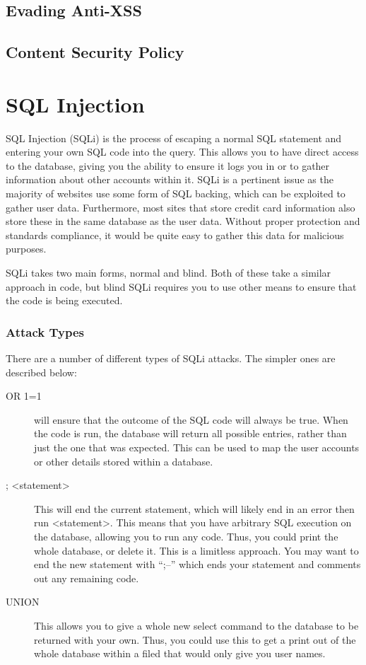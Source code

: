 		\subsection{Evading Anti-XSS}
		\subsection{Content Security Policy}
	\section{SQL Injection}
		SQL Injection (SQLi) is the process of escaping a normal SQL statement and entering your own SQL code into the query. 
		This allows you to have direct access to the database, giving you the ability to ensure it logs you in or to gather information about other accounts within it. 
		SQLi is a pertinent issue as the majority of websites use some form of SQL backing, which can be exploited to gather user data. 
		Furthermore, most sites that store credit card information also store these in the same database as the user data. 
		Without proper protection and standards compliance, it would be quite easy to gather this data for malicious purposes. 

		SQLi takes two main forms, normal and blind. 
		Both of these take a similar approach in code, but blind SQLi requires you to use other means to ensure that the code is being executed. 
		\subsubsection{Attack Types}
			There are a number of different types of SQLi attacks. 
			The simpler ones are described below:
			\begin{description}
				\item[OR 1=1] will ensure that the outcome of the SQL code will always be true. 
					When the code is run, the database will return all possible entries, rather than just the one that was expected. 
					This can be used to map the user accounts or other details stored within a database. 
				\item[; <statement>] This will end the current statement, which will likely end in an error then run <statement>.
					This means that you have arbitrary SQL execution on the database, allowing you to run any code. 
					Thus, you could print the whole database, or delete it. 
					This is a limitless approach. 
					You may want to end the new statement with ``;--'' which ends your statement and comments out any remaining code. 
				\item[UNION] This allows you to give a whole new select command to the database to be returned with your own. 
					Thus, you could use this to get a print out of the whole database within a filed that would only give you user names. 

			\end{description}
